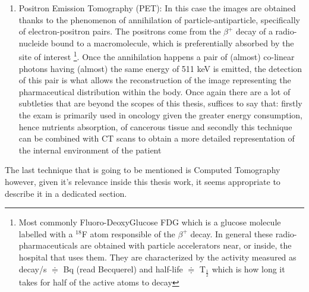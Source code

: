 \begin{enumerate}
\item Positron Emission Tomography (PET): In this case the images are obtained thanks to the phenomenon of annihilation of particle-antiparticle, specifically of electron-positron pairs.	The positrons come from the $\beta ^+$ decay of a radio-nucleide bound to a macromolecule, which is preferentially absorbed by the site of interest \footnote{Most commonly Fluoro-DeoxyGlucose FDG which is a glucose molecule labelled with a $^{18}$F atom responsible of the $\beta ^+$ decay. In general these radio-pharmaceuticals are obtained with particle accelerators near, or inside, the hospital that uses them. They are characterized by the activity measured as decay/s $\doteqdot$ Bq (read Becquerel) and half-life $\doteqdot$ T$_{\frac{1}{2}}$ which is how long it takes for half of the active atoms to decay}. Once the annihilation happens a pair of (almost) co-linear photons having (almost) the same energy of 511 keV is emitted, the detection of this pair is what allows the reconstruction of the image representing the pharmaceutical distribution within the body. Once again there are a lot of subtleties that are beyond the scopes of this thesis, suffices to say that: firstly the exam is primarily used in oncology given the greater energy consumption, hence nutrients absorption, of cancerous tissue and secondly this technique can be combined with CT scans to obtain a more detailed representation of the internal environment of the patient
\end{enumerate}

The last technique that is going to be mentioned is Computed Tomography however, given it's relevance inside this thesis work, it seems appropriate to describe it in a dedicated section.

